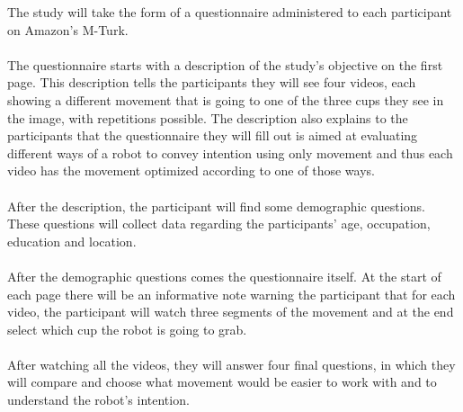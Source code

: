 \documentclass[a4paper,11pt,times,doublespace]{article}
\begin{document}
The study will take the form of a questionnaire administered to each participant on Amazon's M-Turk.\\\\
%
The questionnaire starts with a description of the study's objective on the first page. This description tells the participants they will see four videos, each showing a different movement that is going to one of the three cups they see in the image, with repetitions possible. The description also explains to the participants that the questionnaire they will fill out is aimed at evaluating different ways of a robot to convey intention using only movement and thus each video has the movement optimized according to one of those ways.\\\\
%
After the description, the participant will find some demographic questions. These questions will collect data regarding the participants' age, occupation, education and location.\\\\
%
After the demographic questions comes the questionnaire itself. At the start of each page there will be an informative note warning the participant that for each video, the participant will watch three segments of the movement and at the end select which cup the robot is going to grab.\\\\
%
After watching all the videos, they will answer four final questions, in which they will compare and choose what movement would be easier to work with and to understand the robot's intention.
\end{document}

